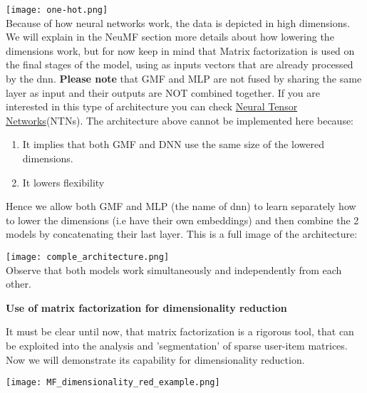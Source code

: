 \documentclass[]{article}
\begin{document}
\begin{center}
	\texttt{[image: one-hot.png]}
	\\
	Because of how neural networks work, the data is depicted in high dimensions. We will explain in the NeuMF section more details about how lowering the dimensions work, but for now keep in mind that Matrix factorization is used on the final stages of the model, using as inputs vectors that are already processed by the dnn. \textbf{Please note} that GMF and MLP are not fused by sharing the same layer as input and their outputs are NOT combined together. If you are interested in this type of architecture you can check \href{http://deeplearn-ai.com/2017/11/21/neural-tensor-network-exploring-relations-among-text-entities/}{Neural Tensor Networks}(NTNs). The architecture above cannot be implemented here because: \begin{enumerate}
		\item It implies that both GMF and DNN use the same size of the lowered dimensions.
		\item It lowers flexibility
	\end{enumerate}
	Hence we allow both GMF and MLP (the name of dnn) to learn separately how to lower the dimensions (i.e have their own embeddings) and then combine the 2 models by concatenating their last layer. This is a full image of the architecture:
	
	\texttt{[image: comple\_architecture.png]}
	\\
	Observe that both models work simultaneously and independently from each other.
	
	\Large\textbf{Use of matrix factorization for dimensionality reduction}
	
	It must be clear until now, that matrix factorization is a rigorous tool, that can be exploited into the analysis and 'segmentation' of sparse user-item matrices. Now we will demonstrate its capability for dimensionality reduction.
	
	\texttt{[image: MF\_dimensionality\_red\_example.png]} 
	\\
	

\end{center}
\end{document}
